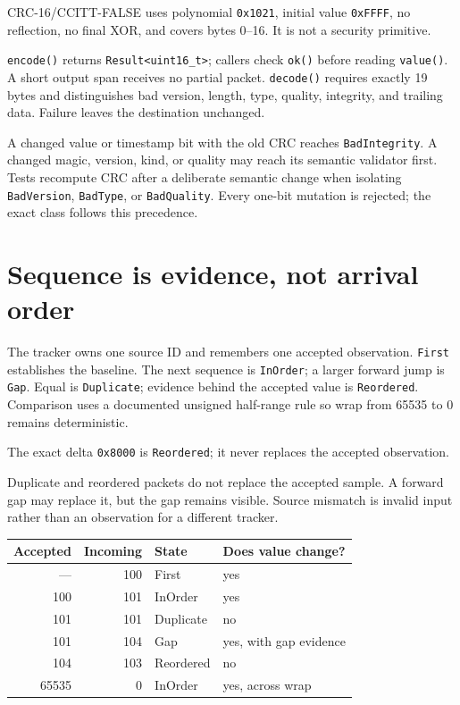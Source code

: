 \documentclass[11pt]{article}
\begin{document}
CRC-16/CCITT-FALSE uses polynomial \texttt{0x1021}, initial value
\texttt{0xFFFF}, no reflection, no final XOR, and covers bytes 0--16. It is not
a security primitive.

\texttt{encode()} returns \texttt{Result<uint16\_t>}; callers check
\texttt{ok()} before reading \texttt{value()}. A short output span receives no
partial packet. \texttt{decode()} requires exactly 19 bytes and distinguishes
bad version, length, type, quality, integrity, and trailing data. Failure
leaves the destination unchanged.

A changed value or timestamp bit with the old CRC reaches
\texttt{BadIntegrity}. A changed magic, version, kind, or quality may reach its
semantic validator first. Tests recompute CRC after a deliberate semantic
change when isolating \texttt{BadVersion}, \texttt{BadType}, or
\texttt{BadQuality}. Every one-bit mutation is rejected; the exact class
follows this precedence.

\section{Sequence is evidence, not arrival order}

The tracker owns one source ID and remembers one accepted observation.
\texttt{First} establishes the baseline. The next sequence is
\texttt{InOrder}; a larger forward jump is \texttt{Gap}. Equal is
\texttt{Duplicate}; evidence behind the accepted value is
\texttt{Reordered}. Comparison uses a documented unsigned half-range rule so
wrap from 65535 to 0 remains deterministic.

The exact delta \texttt{0x8000} is \texttt{Reordered}; it never replaces the
accepted observation.

Duplicate and reordered packets do not replace the accepted sample. A forward
gap may replace it, but the gap remains visible. Source mismatch is invalid
input rather than an observation for a different tracker.

\begin{tabularx}{\linewidth}{@{}r r l X@{}}
\toprule
Accepted & Incoming & State & Does value change?\\
\midrule
--- & 100 & First & yes\\
100 & 101 & InOrder & yes\\
101 & 101 & Duplicate & no\\
101 & 104 & Gap & yes, with gap evidence\\
104 & 103 & Reordered & no\\
65535 & 0 & InOrder & yes, across wrap\\
\bottomrule
\end{tabularx}
\end{document}
